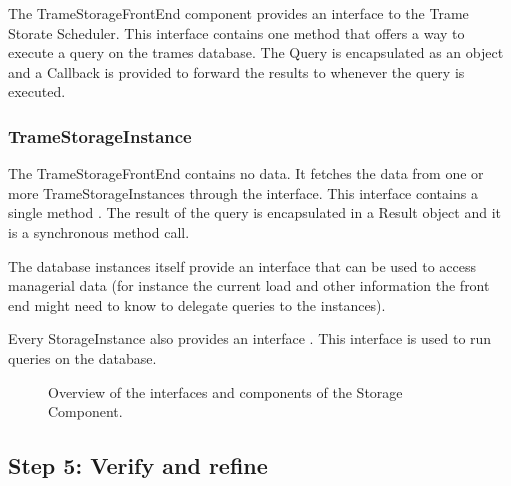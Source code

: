 \npar The TrameStorageFrontEnd component provides an interface
 to the Trame Storate Scheduler. This interface
contains one method  that offers a way
to execute a query on the trames database. The Query is encapsulated as an
object and a Callback is provided to forward the results to whenever the query
is executed.

\subsubsection{TrameStorageInstance}

\npar The TrameStorageFrontEnd contains no data. It fetches the data from one
or more TrameStorageInstances through the 
interface. This interface contains a single method . The result of the query is encapsulated in a Result object and it is
a synchronous method call.

\npar The database instances itself provide an interface
 that can be used to access managerial data (for
instance the current load and other information the front end might need to
know to delegate queries to the instances).

\npar Every StorageInstance also provides an interface .
This interface is used to run queries on the database. 


\begin{figure}[H]
	\begin{centering}
		\caption{Overview of the interfaces and components of the Storage Component.}
		\label{fig:it4/interfaces}
	\end{centering}
\end{figure}

\subsection{Step 5: Verify and refine}
\label{add:it4/verification}

